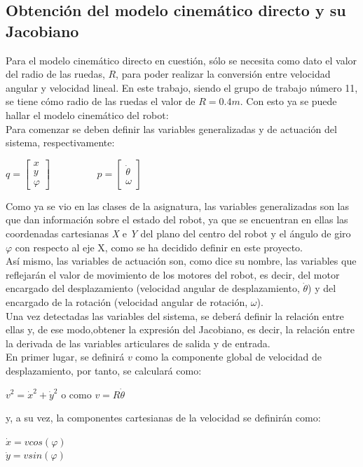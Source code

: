 \documentclass[a4paper,twoside]{article}
\begin{document}
\subsection{Obtención del modelo cinemático directo y su Jacobiano}
Para el modelo cinemático directo en cuestión, sólo se necesita como dato el valor del radio de las ruedas, $R$, para poder realizar la conversión entre velocidad angular y velocidad lineal. En este trabajo, siendo el grupo de trabajo número 11, se tiene cómo radio de las ruedas el valor de $R = 0.4 m$. Con esto ya se puede hallar el modelo cinemático del robot:\\

	Para comenzar se deben definir las variables generalizadas y de actuación del sistema, respectivamente:
	\begin{center}
		$
		q=
		\begin{bmatrix}
		x\\
		y\\
		\varphi
		\end{bmatrix}
		$$
		\hspace{2cm}
		$$
		p=
		\begin{bmatrix}
		\dot{\theta} \\
		\omega
		\end{bmatrix}
		$
\end{center}

Como ya se vio en las clases de la asignatura, las variables generalizadas son las que dan información sobre el estado del robot, ya que se encuentran en ellas las coordenadas cartesianas \textit{X} e \textit{Y} del plano del centro del robot y el ángulo de giro $\varphi$ con respecto al eje X, como se ha decidido definir en este proyecto.\\
Así mismo, las variables de actuación son, como dice su nombre, las variables que reflejarán el valor de movimiento de los motores del robot, es decir, del motor encargado del desplazamiento (velocidad angular de desplazamiento, $\dot{\theta}$) y del encargado de la rotación (velocidad angular de rotación, $\omega$).\\

Una vez detectadas las variables del sistema, se deberá definir la relación entre ellas y, de ese modo,obtener la expresión del Jacobiano, es decir, la relación entre la derivada de las variables articulares de salida y de entrada.\\
En primer lugar, se definirá $v$ como la componente global de velocidad de desplazamiento, por tanto, se calculará como:
\begin{center}
	$v^2=\dot{x}^2+\dot{y}^2$ o como $v=R \dot{\theta}$
	\end{center}
	y, a su vez, la componentes cartesianas de la velocidad se definirán como:
	\begin{center}
	$\dot{x}=v cos(\varphi)$\\
	$\dot{y}=v sin(\varphi)$
	\end{center}
\end{document}
